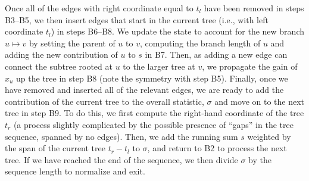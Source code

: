\documentclass[9pt,twoside,lineno]{gsajnl}
\newcommand{\algorithmref}[1]{#1}
\begin{document}
Once all of the edges with right coordinate equal to $t_l$ have been removed in
steps \algorithmref{B3--B5}, we then insert edges that start in the current tree
(i.e., with left coordinate $t_l$) in steps \algorithmref{B6--B8}. We update the
state to account for the new branch $u \mapsto v$ by setting the parent of
$u$ to $v$, computing the branch length of $u$ and adding the new contribution
of $u$ to $s$ in \algorithmref{B7}. Then, as adding a new edge can connect the
subtree rooted at $u$ to the larger tree at $v$, we propagate the gain of $x_u$
up the tree in step \algorithmref{B8} (note the symmetry with step \algorithmref{B5}).
Finally, once we have removed and inserted all of the relevant edges, we are
ready to add the contribution of the current tree to the overall statistic,
$\sigma$ and move on to the next tree in step \algorithmref{B9}. To do this, we first
compute the right-hand coordinate of the tree $t_r$ (a process slightly
complicated by the possible presence of ``gaps'' in the tree sequence, spanned
by no edges). Then, we add the running sum $s$ weighted by the span of the
current tree $t_r - t_l$ to $\sigma$, and return to \algorithmref{B2} to process the
next tree. If we have reached the end of the sequence, we then divide $\sigma$
by the sequence length to normalize and exit.
\end{document}
